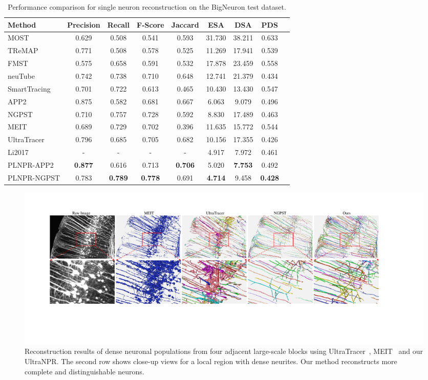 \begin{table}[h]
	\centering
	\makeatletter{}\makeatother
	\caption{Performance comparison for single neuron reconstruction on the BigNeuron test dataset.}
	\label{table:compare_BigNeuron}
	\begin{tabular}{lcccccccc}
		\toprule
		Method & Precision & Recall & F-Score & Jaccard & ESA & DSA & PDS\\
		\midrule
		MOST~\cite{Wu2014} & 0.629 & 0.508 & 0.541 & 0.593 & 31.730 & 38.211 & 0.633\\
		TReMAP~\cite{Zhou2016} & 0.771 & 0.508 & 0.578 & 0.525 & 11.269 & 17.941 & 0.539\\
		FMST~\cite{Yang2019} & 0.575 & 0.658 & 0.591 & 0.532 & 17.878 & 23.459 & 0.558\\
		neuTube~\cite{Feng2015} & 0.742&0.738&0.710&0.648&12.741&21.379&0.434&\\
		SmartTracing~\cite{Chen2015} & 0.701 & 0.722 & 0.613 & 0.465 & 10.430 & 13.430 & 0.547\\
		APP2~\cite{Xiao2013} & 0.875 & 	0.582 & 0.681 & 0.667 & 6.063 & 9.079 & 0.496\\
		NGPST~\cite{Quan2015} & 0.710 & 0.757 & 0.728 & 0.592 & 8.830 & 17.489 & 0.463\\
		MEIT~\cite{Wang2018} & 0.689  & 0.729 & 0.702 & 0.396 & 11.635 &15.772 & 0.544 \\
		UltraTracer~\cite{Peng2017} & 0.796 & 0.685 & 0.705 & 0.682 & 10.156 & 17.355 & 0.426 \\
		Li2017~\cite{Li2017} & - & - & - & - & 4.917 & 7.972 &0.461 \\
		\midrule
		PLNPR-APP2 & \textbf{0.877} & 0.616 & 0.713 & \textbf{0.706} & 5.020 & \textbf{7.753} & 0.492\\
		PLNPR-NGPST &0.783&\textbf{0.789}&\textbf{0.778}&0.691&\textbf{4.714}&9.458 & \textbf{0.428}\\
		\bottomrule
	\end{tabular}
\end{table}

\begin{figure}[t]
	\centering
	\includegraphics[width=\textwidth]{./Illustrations/comparison_ultranpr2.pdf}
	\caption{Reconstruction results of dense neuronal populations from four adjacent large-scale blocks using UltraTracer~\cite{Peng2017}, MEIT~\cite{Wang2018} and our UltraNPR. The second row shows close-up views for a local region with dense neurites. Our method reconstructs more complete and distinguishable neurons. 
	}
	\label{fig:reconstruct_blocks}
\end{figure}

